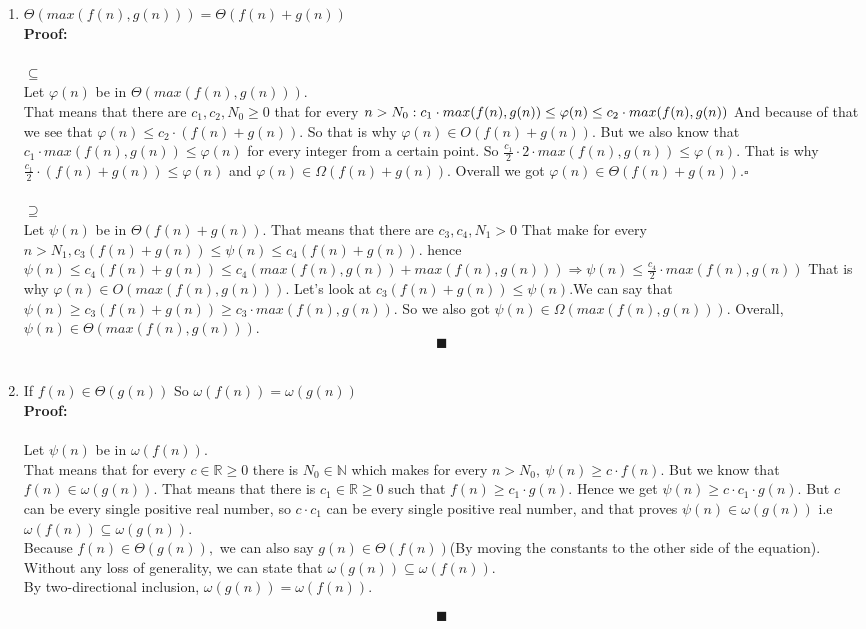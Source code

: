 \documentclass{article}
\begin{document}
\begin{enumerate}
    \item $\Theta(max(f(n), g(n)))=\Theta(f(n)+g(n))$\\
    \textbf{Proof:}\\\\
    $\subseteq$\\
    Let $\varphi(n)$ be in $\Theta(max(f(n), g(n))).$\\ That means that there are $c_1, c_2, N_0 \ge0$ that for every $n>N_0:\\ c_1\cdot max(f(n), g(n))\le\varphi(n)\le c_2\cdot max(f(n), g(n))$ And because of that we see that $\varphi(n)\le c_2\cdot\left(f(n)+g(n)\right).$ So that is why $\varphi(n)\in O(f(n)+g(n)).$ But we also know that $c_1\cdot max(f(n), g(n))\le\varphi(n)$ for every integer from a certain point. So $\frac{c_1}{2}\cdot2\cdot max(f(n), g(n))\le\varphi(n)$. That is why $\frac{c_1}{2}\cdot(f(n)+g(n))\le\varphi(n)$ and $\varphi(n)\in\Omega(f(n)+g(n))$. Overall we got $\varphi(n)\in\Theta(f(n)+g(n)). \square$\\\\
    $\supseteq$\\
    Let $\psi(n)$ be in $\Theta(f(n)+g(n))$. That means that there are $c_3,c_4,N_1>0$ That make for every $n>N_1, c_3(f(n)+g(n))\le\psi(n)\le c_4(f(n)+g(n)).$ hence $\psi(n)\le c_4(f(n)+g(n))\le c_4(max(f(n), g(n))+max(f(n), g(n)))\Rightarrow\psi(n)\le\frac{c_4}{2}\cdot max(f(n), g(n))$ That is why $\varphi(n)\in O(max(f(n), g(n))).$ Let's look at $c_3(f(n)+g(n))\le\psi(n). $We can say that $\psi(n)\ge c_3(f(n)+g(n))\ge c_3\cdot max(f(n), g(n))$. So we also got $\psi(n)\in\Omega(max(f(n), g(n))).$ Overall, $\psi(n)\in\Theta(max(f(n), g(n))).$
    $$\blacksquare$$\\
    \item If $f(n)\in\Theta(g(n))$ So $\omega(f(n))=\omega(g(n))$\\
    \textbf{Proof:}\\\\
    Let $\psi(n)$ be in $\omega(f(n))$.\\
    That means that for every $c\in\mathbb{R}\ge0$ there is $N_0\in\mathbb{N}$ which makes for every $n>N_0,\ 
     \psi(n)\ge c\cdot f(n).$
     But we know that $f(n)\in\omega(g(n)).$
     That means that there is $c_1\in\mathbb{R}\ge0$ such that $f(n)\ge c_1\cdot g(n)$.
     Hence we get $\psi(n)\ge c\cdot c_1\cdot g(n).$
     But $c$ can be every single positive real number, so
     $c\cdot c_1$ can be every single positive real number,
     and that proves $\psi(n)\in\omega(g(n))$
     i.e $\omega(f(n))\subseteq\omega(g(n))$.\\
     Because $f(n)\in\Theta(g(n)),$ we can also say $g(n)\in\Theta(f(n))$(By moving the constants to the other side of the equation).\\
     Without any loss of generality, we can state that $\omega(g(n))\subseteq\omega(f(n)).$\\
     By two-directional inclusion, 
     $\omega(g(n))=\omega(f(n)).$
     
     $$\blacksquare$$
     \end{enumerate}
    
\end{document}

